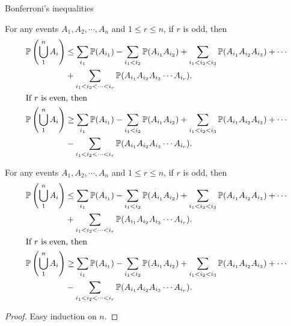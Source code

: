 %
\begin{note}
  \begin{field}
    Bonferroni's inequalities
  \end{field}
  \begin{field}
    \begin{thm}
      For any events $A_1, A_2, \cdots, A_n$ and $1 \leq r\leq n$, if $r$ is odd, then
      \begin{align*}
        \P\left(\bigcup_{1}^n A_i\right) &\leq \sum_{i_1} \P(A_{i_1}) - \sum_{i_1 < i_2} \P(A_{i_1}A_{i_2}) + \sum_{i_1 < i_2 < i_3} \P(A_{i_1}A_{i_2}A_{i_3}) + \cdots\\
        &+ \sum_{i_1 < i_2 < \cdots < i_r} \P(A_{i_1}A_{i_2}A_{i_3}\cdots A_{i_r}).\\
        \intertext{If $r$ is even, then}
        \P\left(\bigcup_{1}^n A_i\right) &\geq \sum_{i_1} \P(A_{i_1}) - \sum_{i_1 < i_2} \P(A_{i_1}A_{i_2}) + \sum_{i_1 < i_2 < i_3} \P(A_{i_1}A_{i_2}A_{i_3}) + \cdots\\
        &- \sum_{i_1 < i_2 < \cdots < i_r} \P(A_{i_1}A_{i_2}A_{i_3}\cdots A_{i_r}).
      \end{align*}
    \end{thm}
  \end{field}
  \xplain{}%
\end{note}

%
\begin{note}
  \begin{field}
    \begin{thm}
      For any events $A_1, A_2, \cdots, A_n$ and $1 \leq r\leq n$, if $r$ is odd, then
      \begin{align*}
        \P\left(\bigcup_{1}^n A_i\right) &\leq \sum_{i_1} \P(A_{i_1}) - \sum_{i_1 < i_2} \P(A_{i_1}A_{i_2}) + \sum_{i_1 < i_2 < i_3} \P(A_{i_1}A_{i_2}A_{i_3}) + \cdots\\
        &+ \sum_{i_1 < i_2 < \cdots < i_r} \P(A_{i_1}A_{i_2}A_{i_3}\cdots A_{i_r}).\\
        \intertext{If $r$ is even, then}
        \P\left(\bigcup_{1}^n A_i\right) &\geq \sum_{i_1} \P(A_{i_1}) - \sum_{i_1 < i_2} \P(A_{i_1}A_{i_2}) + \sum_{i_1 < i_2 < i_3} \P(A_{i_1}A_{i_2}A_{i_3}) + \cdots\\
        &- \sum_{i_1 < i_2 < \cdots < i_r} \P(A_{i_1}A_{i_2}A_{i_3}\cdots A_{i_r}).
      \end{align*}
    \end{thm}
  \end{field}
  \begin{field}
    \begin{proof}
      Easy induction on $n$.
    \end{proof}
  \end{field}
  \xplain{}%
\end{note}


